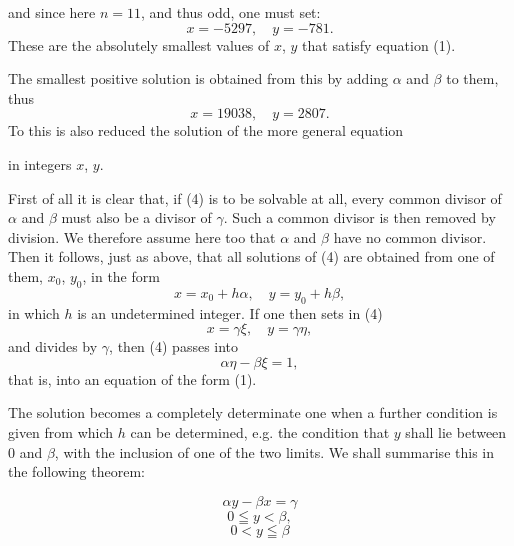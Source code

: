 and since here $n = 11$, and thus odd, one must set:
\[
x = -5297, \quad y = -781.
\]
These are the absolutely smallest values of $x$, $y$ that satisfy equation (1).

The smallest positive solution is obtained from this by adding $\alpha$ and $\beta$ to them, thus
\[
x = 19038, \quad y = 2807.
\]
To this is also reduced the solution of the more general equation

in integers $x$, $y$.

First of all it is clear that, if (4) is to be solvable at all, every common divisor of $\alpha$ and $\beta$ must also be a divisor of $\gamma$. Such a common divisor is then removed by division. We therefore assume here too that $\alpha$ and $\beta$ have no common divisor. Then it follows, just as above, that all solutions of (4) are obtained from one of them, $x_0$, $y_0$, in the form
\[
x = x_0 + h \alpha, \quad y = y_0 + h \beta,
\]
in which $h$ is an undetermined integer. If one then sets in (4)
\[
x = \gamma \xi, \quad y = \gamma \eta,
\]
and divides by $\gamma$, then (4) passes into
\[
\alpha \eta - \beta \xi = 1,
\]
that is, into an equation of the form (1).

The solution becomes a completely determinate one when a further condition is given from which $h$ can be determined, e.g. the condition that $y$ shall lie between $0$ and $\beta$, with the inclusion of one of the two limits. We shall summarise this in the following theorem:

\[
\alpha y - \beta x = \gamma
\]
\[
0 \leqq y < \beta,
\]
\[
0 < y \leqq \beta
\]
